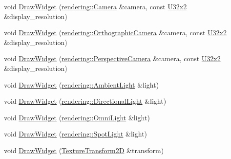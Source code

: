 \begin{DoxyCompactItemize}
\item 
void \mbox{\hyperlink{namespacemage_1_1script_1_1anonymous__namespace_02editor__script_8cpp_03_a0ccfdbcbbed7eb38dda2119cd6d91c5e}{Draw\+Widget}} (\mbox{\hyperlink{classmage_1_1rendering_1_1_camera}{rendering\+::\+Camera}} \&camera, const \mbox{\hyperlink{namespacemage_ae5e7ccf8a1785baaacf57b3a0f4324e2}{U32x2}} \&display\+\_\+resolution)
\item 
void \mbox{\hyperlink{namespacemage_1_1script_1_1anonymous__namespace_02editor__script_8cpp_03_a8245978cf439e5e006cc04a5e3b8c454}{Draw\+Widget}} (\mbox{\hyperlink{classmage_1_1rendering_1_1_orthographic_camera}{rendering\+::\+Orthographic\+Camera}} \&camera, const \mbox{\hyperlink{namespacemage_ae5e7ccf8a1785baaacf57b3a0f4324e2}{U32x2}} \&display\+\_\+resolution)
\item 
void \mbox{\hyperlink{namespacemage_1_1script_1_1anonymous__namespace_02editor__script_8cpp_03_a30d488a4869cbdc33a95a38eb2754277}{Draw\+Widget}} (\mbox{\hyperlink{classmage_1_1rendering_1_1_perspective_camera}{rendering\+::\+Perspective\+Camera}} \&camera, const \mbox{\hyperlink{namespacemage_ae5e7ccf8a1785baaacf57b3a0f4324e2}{U32x2}} \&display\+\_\+resolution)
\item 
void \mbox{\hyperlink{namespacemage_1_1script_1_1anonymous__namespace_02editor__script_8cpp_03_a8fae9ee9468220d523f8342c0b84d577}{Draw\+Widget}} (\mbox{\hyperlink{classmage_1_1rendering_1_1_ambient_light}{rendering\+::\+Ambient\+Light}} \&light)
\item 
void \mbox{\hyperlink{namespacemage_1_1script_1_1anonymous__namespace_02editor__script_8cpp_03_ae09b38a4a757ecd67e944a9605030d03}{Draw\+Widget}} (\mbox{\hyperlink{classmage_1_1rendering_1_1_directional_light}{rendering\+::\+Directional\+Light}} \&light)
\item 
void \mbox{\hyperlink{namespacemage_1_1script_1_1anonymous__namespace_02editor__script_8cpp_03_a6be8a0f5d812d1d6ef9f2b6227213f77}{Draw\+Widget}} (\mbox{\hyperlink{classmage_1_1rendering_1_1_omni_light}{rendering\+::\+Omni\+Light}} \&light)
\item 
void \mbox{\hyperlink{namespacemage_1_1script_1_1anonymous__namespace_02editor__script_8cpp_03_a4a986ab674be382e62fe0c0eda23bd3a}{Draw\+Widget}} (\mbox{\hyperlink{classmage_1_1rendering_1_1_spot_light}{rendering\+::\+Spot\+Light}} \&light)
\item 
void \mbox{\hyperlink{namespacemage_1_1script_1_1anonymous__namespace_02editor__script_8cpp_03_ad26d30000f327cfdb0df7b914c93e833}{Draw\+Widget}} (\mbox{\hyperlink{classmage_1_1_texture_transform2_d}{Texture\+Transform2D}} \&transform)

\end{DoxyCompactItemize}

